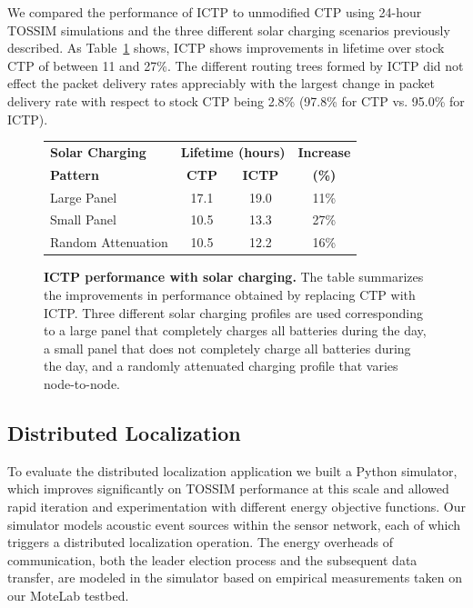 We compared the performance of ICTP to unmodified CTP using 24-hour TOSSIM
simulations and the three different solar charging scenarios previously
described. As Table~\ref{idea-table-ictpvoptimaltossim} shows, ICTP shows
improvements in lifetime over stock CTP of between 11 and 27\%. The different
routing trees formed by ICTP did not effect the packet delivery rates
appreciably with the largest change in packet delivery rate with respect to
stock CTP being 2.8\% (97.8\% for CTP vs. 95.0\% for ICTP).

\begin{figure}[t]
\begin{center}
\begin{tabular}{|l|ccc|}
\hline
\textbf{Solar Charging} & \multicolumn{2}{c}{\textbf{Lifetime (hours)}} & \textbf{Increase} \\
\textbf{Pattern} & \textbf{CTP} & \textbf{ICTP} & \textbf{(\%)} \\ \hline
Large Panel & 17.1 & 19.0 & 11\% \\
Small Panel & 10.5 & 13.3 & 27\% \\
Random Attenuation & 10.5 & 12.2 & 16\% \\ \hline
\end{tabular}
\end{center}

\caption{\textbf{ICTP performance with solar charging.} The table summarizes
the improvements in performance obtained by replacing CTP with ICTP. Three
different solar charging profiles are used corresponding to a large panel
that completely charges all batteries during the day, a small panel that does
not completely charge all batteries during the day, and a randomly attenuated
charging profile that varies node-to-node.}

\label{idea-table-ictpvoptimaltossim}
\end{figure}

\subsection{Distributed Localization}

To evaluate the distributed localization application we built a Python
simulator, which improves significantly on TOSSIM performance at this scale
and allowed rapid iteration and experimentation with different energy
objective functions. Our simulator models acoustic event sources within the
sensor network, each of which triggers a distributed localization operation.
The energy overheads of communication, both the leader election process and
the subsequent data transfer, are modeled in the simulator based on empirical
measurements taken on our MoteLab testbed.

